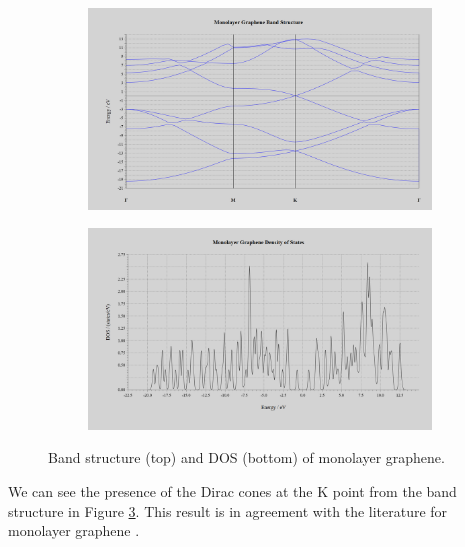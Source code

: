\documentclass[]{article}
\begin{document}
\begin{figure}[H]
	\centering
	\begin{subfigure}[b]{\textwidth}
		\includegraphics[width = \textwidth]{monolayer_graphene_band.PNG}
		\label{fig: monolayer_graphene_band}
	\end{subfigure}
	\hfill
	\begin{subfigure}[b]{\textwidth}
		\includegraphics[width = \textwidth]{monolayer_graphene_dos.PNG}
		\label{fig: monolayer_graphene_dos}
	\end{subfigure}
	\caption{Band structure (top) and DOS (bottom) of monolayer graphene. }
	\label{fig: monolayer_graphene_band_dos}
\end{figure}

We can see the presence of the Dirac cones at the K point from the band structure in Figure \ref{fig: monolayer_graphene_band_dos}. This result is in agreement with the literature for monolayer graphene \cite{The_Electronic_Properties_of_Graphene, Properties_of_graphene:_a_theoretical_perspective}.


\newpage
\end{document}
